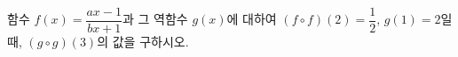 \hspace*{2mm}\begin{minipage}[t]{\dimexpr\linewidth-2mm\relax}\vspace{0pt}
함수 $f(x)=\dfrac{ax-1}{bx+1}$과 그 역함수 $g(x)$에 대하여 $(f\circ f)(2)=\dfrac{1}{2}$, $g(1)=2$일 때, $(g\circ g)(3)$의 값을 구하시오. \end{minipage}
